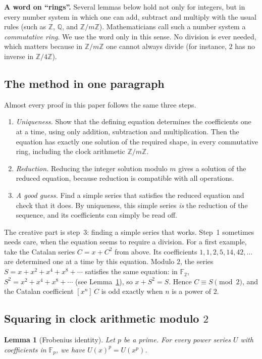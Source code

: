 \documentclass[11pt,a4paper]{article}
\newtheorem{lemma}[theorem]{Lemma}
\theoremstyle{definition}
\theoremstyle{remark}
\newcommand{\Z}{\mathbb{Z}}
\newcommand{\Q}{\mathbb{Q}}
\newcommand{\F}{\mathbb{F}}
\newcommand{\coeff}[2]{[x^{#1}]\,#2}
\newcommand{\para}[1]{\par\medskip\noindent\textbf{#1}\enspace}
\begin{document}
\para{A word on ``rings''.} Several lemmas below hold not only for integers, but in every number system in
which one can add, subtract and multiply with the usual rules (such as $\Z$, $\Q$, and $\Z/m\Z$). Mathematicians call
such a number system a \emph{commutative ring}. We use the word only in this sense. No division is ever needed, which
matters because in $\Z/m\Z$ one cannot always divide (for instance, $2$ has no inverse in $\Z/4\Z$).

\subsection{The method in one paragraph}
Almost every proof in this paper follows the same three steps.
\begin{enumerate}
\item \emph{Uniqueness.} Show that the defining equation determines the coefficients one at a time, using only
addition, subtraction and multiplication. Then the equation has exactly one solution of the required shape, in every
commutative ring, including the clock arithmetic $\Z/m\Z$.
\item \emph{Reduction.} Reducing the integer solution modulo $m$ gives a solution of the reduced equation,
because reduction is compatible with all operations.
\item \emph{A good guess.} Find a simple series that satisfies the reduced equation and check that it does. By uniqueness,
this simple series \emph{is} the reduction of the sequence, and its coefficients can simply be read off.
\end{enumerate}
The creative part is step~3: finding a simple series that works. Step~1 sometimes needs care, when the equation seems to
require a division.
For a first example, take the Catalan series $C=x+C^2$ from above. Its coefficients $1,1,2,5,14,42,\dots$ are
determined one at a time by this equation. Modulo $2$, the series $S=x+x^2+x^4+x^8+\cdots$ satisfies the same
equation: in $\F_2$, $S^2=x^2+x^4+x^8+\cdots$ (see Lemma~\ref{lem:frobenius}), so $x+S^2=S$. Hence $C\equiv S\pmod2$,
and the Catalan coefficient $\coeff{n}{C}$ is odd exactly when $n$ is a power of $2$.

\subsection{Squaring in clock arithmetic modulo \texorpdfstring{$2$}{2}}
\begin{lemma}[Frobenius identity]\label{lem:frobenius}
Let $p$ be a prime. For every power series $U$ with coefficients in $\F_p$, we have $U(x)^p=U(x^p)$.
\end{lemma}
\end{document}
